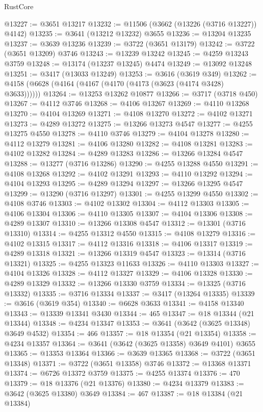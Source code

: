 \begin{lexlean}{RustCore}
\begin{coremodule}
@13227 := @3651 @13217
@13232 := @11506 (@3662 (@13226 (@3716 @13227)) @4142)
@13235 := @3641 (@13212 @13232) @3655
@13236 := @13204 @13235
@13237 := @3639 @13236
@13239 := @3722 (@3651 @13179)
@13242 := @3722 (@3651 @13209) @3746
@13243 := @13239 @13242
@13245 := @4259 @13243 @3759
@13248 := @13174 (@13237 @13245) @4474
@13249 := @13092 @13248
@13251 := @3417 (@13033 @13249)
@13253 := @3616 (@3619 @349)
@13262 := @4158 (@6628 (@4164 (@4167 (@4170 (@4173 (@3623 (@4174 @3428) @3633))))))
@13264 := @13253 @13262 @10877
@13266 := @3717 (@3718 @450)
@13267 := @4112 @3746
@13268 := @4106 @13267
@13269 := @4110 @13268
@13270 := @4104 @13269
@13271 := @4108 @13270
@13272 := @4102 @13271
@13273 := @4289 @13272
@13275 := @13266 @13273 @4547
@13277 := @4255 @13275 @4550
@13278 := @4110 @3746
@13279 := @4104 @13278
@13280 := @4112 @13279
@13281 := @4106 @13280
@13282 := @4108 @13281
@13283 := @4102 @13282
@13284 := @4289 @13283
@13286 := @13266 @13284 @4547
@13288 := @13277 (@3716 @13286)
@13290 := @4255 @13288 @4550
@13291 := @4108 @13268
@13292 := @4102 @13291
@13293 := @4110 @13292
@13294 := @4104 @13293
@13295 := @4289 @13294
@13297 := @13266 @13295 @4547
@13299 := @13290 (@3716 @13297)
@13301 := @4255 @13299 @4550
@13302 := @4108 @3746
@13303 := @4102 @13302
@13304 := @4112 @13303
@13305 := @4106 @13304
@13306 := @4110 @13305
@13307 := @4104 @13306
@13308 := @4289 @13307
@13310 := @13266 @13308 @4547
@13312 := @13301 (@3716 @13310)
@13314 := @4255 @13312 @4550
@13315 := @4108 @13279
@13316 := @4102 @13315
@13317 := @4112 @13316
@13318 := @4106 @13317
@13319 := @4289 @13318
@13321 := @13266 @13319 @4547
@13323 := @13314 (@3716 @13321)
@13325 := @4255 @13323 @11633
@13326 := @4110 @13303
@13327 := @4104 @13326
@13328 := @4112 @13327
@13329 := @4106 @13328
@13330 := @4289 @13329
@13332 := @13266 @13330 @3759
@13334 := @13325 (@3716 @13332)
@13335 := @3716 @13334
@13337 := @3417 (@13264 @13335)
@13339 := @3616 (@3619 @354)
@13340 := @6628 @3633
@13341 := @4158 @13340
@13343 := @13339 @13341 @3430
@13344 := 465
@13347 := @18 @13344 (@21 @13344)
@13348 := @4234 @13347
@13353 := @3641 (@3642 (@3625 @13348) @3649 @4532)
@13354 := 466
@13357 := @18 @13354 (@21 @13354)
@13358 := @4234 @13357
@13364 := @3641 (@3642 (@3625 @13358) @3649 @4101) @3655
@13365 := @13353 @13364
@13366 := @3639 @13365
@13368 := @3722 (@3651 @13348)
@13371 := @3722 (@3651 @13358) @3746
@13372 := @13368 @13371
@13374 := @6726 @13372 @3759
@13375 := @4255 @13374
@13376 := 470
@13379 := @18 @13376 (@21 @13376)
@13380 := @4234 @13379
@13383 := @3642 (@3625 @13380) @3649
@13384 := 467
@13387 := @18 @13384 (@21 @13384)

\end{coremodule}
\end{lexlean}
